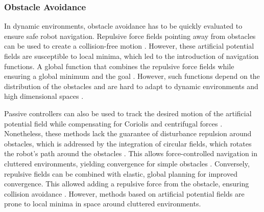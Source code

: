 \subsubsection{Obstacle Avoidance}
In dynamic environments, obstacle avoidance has to be quickly evaluated to ensure safe robot navigation. Repulsive force fields pointing away from obstacles can be used to create a collision-free motion \parencite{khatib1987unified}. 
However, these artificial potential fields are susceptible to local minima, which led to the introduction of navigation functions. A global function that combines the repulsive force fields while ensuring a global minimum and the goal \parencite{koditschek1990robot}. However, such functions depend on the distribution of the obstacles and are hard to adapt to dynamic environments and high dimensional spaces \parencite{loizou2022mobile}.


Passive controllers can also be used to track the desired motion of the artificial potential field while compensating for Coriolis and centrifugal forces \parencite{duindam2004passive}. 
Nonetheless, these methods lack the guarantee of disturbance repulsion around obstacles, which is addressed by the integration of circular fields, which rotates the robot's path around the obstacles \parencite{singh1996real}. 
This allows force-controlled navigation in cluttered environments, yielding convergence for simple obstacles \parencite{haddadin2011dynamic}. 
Conversely, repulsive fields can be combined with elastic, global planning \parencite{brock2002elastic} for improved convergence. This allowed adding a repulsive force from the obstacle, ensuring collision avoidance \parencite{tulbure2020closing}. 
However, methods based on artificial potential fields are prone to local minima in space around cluttered environments.

